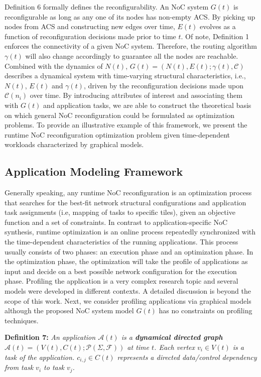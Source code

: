 {{\noindent Definition 6 formally defines the reconfigurability. An NoC system $G(t)$ is reconfigurable as long as any one of its nodes has non-empty ACS. By picking up nodes from ACS and constructing new edges over time, $E(t)$ evolves as a function of reconfiguration decisions made prior to time $t$. Of note, Definition 1 enforces the connectivity of a given NoC system. Therefore, the routing algorithm $\gamma(t)$ will also change accordingly to guarantee all the nodes are reachable. Combined with the dynamics of $N(t)$, $G(t)=(N(t),E(t);\gamma(t),\mathcal C)$ describes a dynamical system with time-varying structural characteristics, i.e., $N(t)$, $E(t)$ and $\gamma(t)$, driven by the reconfiguration decisions made upon $\mathcal C(n_i)$ over time. By introducing attributes of interest and associating them with $G(t)$ and application tasks, we are able to construct the theoretical basis on which general NoC reconfiguration could be formulated as optimization problems. To provide an illustrative example of this framework, we present the runtime NoC reconfiguration optimization problem given time-dependent workloads characterized by graphical models.
\subsection{Application Modeling Framework}
Generally speaking, any runtime NoC reconfiguration is an optimization process that searches for the best-fit network structural configurations and application task assignments (i.e, mapping of tasks to specific tiles), given an objective function and a set of constraints. In contrast to application-specific NoC synthesis, runtime optimization is an online process repeatedly synchronized with the time-dependent characteristics of the running applications. This process usually consists of two phases: an execution phase and an optimization phase. In the optimization phase, the optimization will take the profile of applications as input and decide on a best possible network configuration for the execution phase. Profiling the application is a very complex research topic and several models were developed in different contexts. A detailed discussion is beyond the scope of this work. Next, we consider profiling applications via graphical models although the proposed NoC system model $G(t)$ has no constraints on profiling techniques.

\noindent \textbf{Definition 7:}\label{def:app} \textit{ An application $\mathcal A(t)$ is a \textbf{dynamical directed graph} $\mathcal A(t)=(V(t),C(t);\mathcal P(\Sigma,\mathcal F))$ at time $t$. Each vertex $v_{i} \in V(t)$ is a task of the application. $c_{i,j} \in C(t)$ represents a directed data/control dependency from task $v_i$ to task $v_{j}$. }
 
}}
